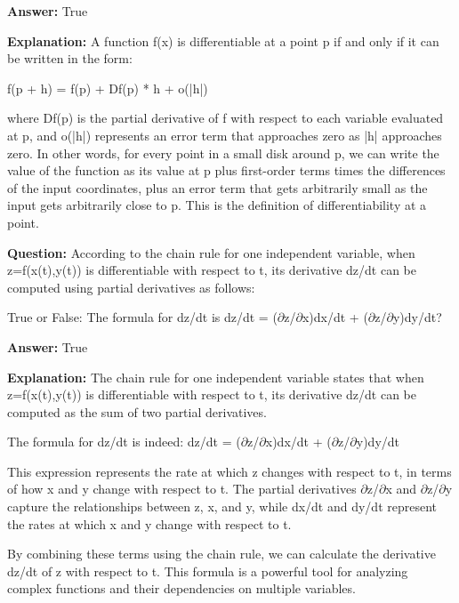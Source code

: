 \documentclass{article}
\begin{document}
                \textbf{Answer:} True

                \textbf{Explanation:} A function f(x) is differentiable at a point p if and only if it can be written in the form:

f(p + h) = f(p) + Df(p) * h + o(|h|)

where Df(p) is the partial derivative of f with respect to each variable evaluated at p, and o(|h|) represents an error term that approaches zero as |h| approaches zero. In other words, for every point in a small disk around p, we can write the value of the function as its value at p plus first-order terms times the differences of the input coordinates, plus an error term that gets arbitrarily small as the input gets arbitrarily close to p. This is the definition of differentiability at a point.
                
                \vspace{0.5cm} 
        
            
                \textbf {Question:} According to the chain rule for one independent variable, when z=f(x(t),y(t)) is differentiable with respect to t, its derivative dz/dt can be computed using partial derivatives as follows:

True or False: The formula for dz/dt is dz/dt = (\ensuremath{\partial}z/\ensuremath{\partial}x)dx/dt + (\ensuremath{\partial}z/\ensuremath{\partial}y)dy/dt?
                
                \textbf{Answer:} True

                \textbf{Explanation:} The chain rule for one independent variable states that when z=f(x(t),y(t)) is differentiable with respect to t, its derivative dz/dt can be computed as the sum of two partial derivatives.

The formula for dz/dt is indeed: dz/dt = (\ensuremath{\partial}z/\ensuremath{\partial}x)dx/dt + (\ensuremath{\partial}z/\ensuremath{\partial}y)dy/dt

This expression represents the rate at which z changes with respect to t, in terms of how x and y change with respect to t. The partial derivatives \ensuremath{\partial}z/\ensuremath{\partial}x and \ensuremath{\partial}z/\ensuremath{\partial}y capture the relationships between z, x, and y, while dx/dt and dy/dt represent the rates at which x and y change with respect to t.

By combining these terms using the chain rule, we can calculate the derivative dz/dt of z with respect to t. This formula is a powerful tool for analyzing complex functions and their dependencies on multiple variables.
                
\end{document}
